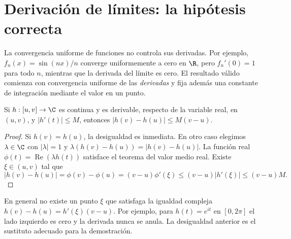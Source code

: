 \section{Derivación de límites: la hipótesis correcta}
La convergencia uniforme de funciones no controla sus derivadas. Por ejemplo, $f_n(x)=\sin(nx)/n$ converge uniformemente a cero en $\R$, pero $f_n'(0)=1$ para todo $n$, mientras que la derivada del límite es cero. El resultado válido comienza con convergencia uniforme de las \emph{derivadas} y fija además una constante de integración mediante el valor en un punto.

\begin{lema}\label{ch26:tvmdesigualdad}
Si $h:[u,v]\to\C$ es continua y es derivable, respecto de la variable real, en $(u,v)$, y $|h'(t)|\le M$, entonces $|h(v)-h(u)|\le M(v-u)$.
\end{lema}
\begin{proof}
Si $h(v)=h(u)$, la desigualdad es inmediata. En otro caso elegimos $\lambda\in\C$ con $|\lambda|=1$ y $\lambda(h(v)-h(u))=|h(v)-h(u)|$. La función real $\phi(t)=\operatorname{Re}(\lambda h(t))$ satisface el teorema del valor medio real. Existe $\xi\in(u,v)$ tal que
\[
 |h(v)-h(u)|=\phi(v)-\phi(u)=(v-u)\phi'(\xi)
 \le(v-u)|h'(\xi)|\le(v-u)M.
\]
\end{proof}

En general no existe un punto $\xi$ que satisfaga la igualdad compleja $h(v)-h(u)=h'(\xi)(v-u)$. Por ejemplo, para $h(t)=e^{it}$ en $[0,2\pi]$ el lado izquierdo es cero y la derivada nunca se anula. La desigualdad anterior es el sustituto adecuado para la demostración.

